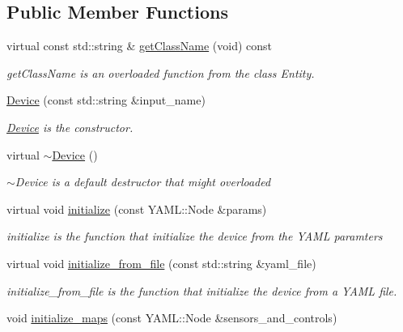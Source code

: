 \subsection*{Public Member Functions}
\begin{DoxyCompactItemize}
\item 
virtual const std\+::string \& \hyperlink{classdynamic__graph_1_1Device_a2aa0523e36b0818e98ad8b12ce7ade6d}{get\+Class\+Name} (void) const 
\begin{DoxyCompactList}\small\item\em get\+Class\+Name is an overloaded function from the class Entity. \end{DoxyCompactList}\item 
\hyperlink{classdynamic__graph_1_1Device_a76c80f6d47e2151494e375e2faf78c0d}{Device} (const std\+::string \&input\+\_\+name)
\begin{DoxyCompactList}\small\item\em \hyperlink{classdynamic__graph_1_1Device}{Device} is the constructor. \end{DoxyCompactList}\item 
virtual \hyperlink{classdynamic__graph_1_1Device_a9dabc419c8d8df3a686c33ce042bc99a}{$\sim$\+Device} ()\hypertarget{classdynamic__graph_1_1Device_a9dabc419c8d8df3a686c33ce042bc99a}{}\label{classdynamic__graph_1_1Device_a9dabc419c8d8df3a686c33ce042bc99a}

\begin{DoxyCompactList}\small\item\em $\sim$\+Device is a default destructor that might overloaded \end{DoxyCompactList}\item 
virtual void \hyperlink{classdynamic__graph_1_1Device_af6edd01afac2838c4e336c76caa4338a}{initialize} (const Y\+A\+M\+L\+::\+Node \&params)
\begin{DoxyCompactList}\small\item\em initialize is the function that initialize the device from the Y\+A\+ML paramters \end{DoxyCompactList}\item 
virtual void \hyperlink{classdynamic__graph_1_1Device_af71d151e69555e9530d770d3d90b7f3e}{initialize\+\_\+from\+\_\+file} (const std\+::string \&yaml\+\_\+file)
\begin{DoxyCompactList}\small\item\em initialize\+\_\+from\+\_\+file is the function that initialize the device from a Y\+A\+ML file. \end{DoxyCompactList}\item 
void \hyperlink{classdynamic__graph_1_1Device_ac4203f6753b2d534c0ade84fb52ac47e}{initialize\+\_\+maps} (const Y\+A\+M\+L\+::\+Node \&sensors\+\_\+and\+\_\+controls)\hypertarget{classdynamic__graph_1_1Device_ac4203f6753b2d534c0ade84fb52ac47e}{}\label{classdynamic__graph_1_1Device_ac4203f6753b2d534c0ade84fb52ac47e}


\end{DoxyCompactItemize}
